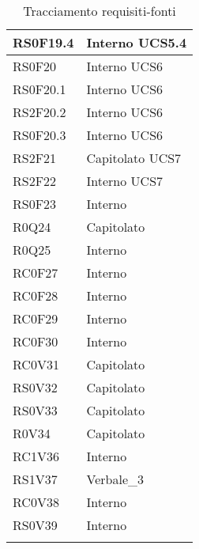 \begin{center}
\begin{longtable}{|p{5cm}|p{5cm}|}
RS0F19.4	& Interno \newline UCS5.4 \\\hline
RS0F20		& Interno \newline UCS6 \\\hline
RS0F20.1	& Interno \newline UCS6 \\\hline
RS2F20.2	& Interno \newline UCS6 \\\hline
RS0F20.3	& Interno \newline UCS6 \\\hline
RS2F21		& Capitolato \newline UCS7 \\\hline
RS2F22		& Interno \newline UCS7 \\\hline
RS0F23		& Interno \\\hline
R0Q24		& Capitolato \\\hline
R0Q25		& Interno \\\hline
RC0F27		& Interno \\\hline
RC0F28		& Interno \\\hline
RC0F29		& Interno \\\hline
RC0F30		& Interno \\\hline
RC0V31		& Capitolato \\\hline
RS0V32		& Capitolato \\\hline
RS0V33		& Capitolato \\\hline
R0V34		& Capitolato \\\hline
RC1V36		& Interno \\\hline
RS1V37		& Verbale\_3 \\\hline
RC0V38		& Interno \\\hline
RS0V39		& Interno \\\hline
\caption{Tracciamento requisiti-fonti}
\end{longtable}
\egroup
\end{center}

